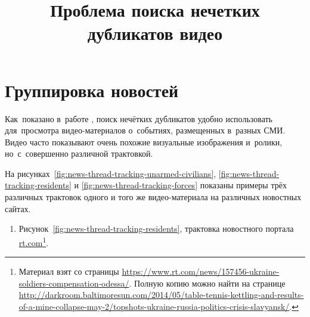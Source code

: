 \documentclass{.local/lib/classes/ndvr-super-article-standalone}
\title[NDVR thesis-abstract]{%
    Проблема поиска нечетких дубликатов видео%
}
\begin{document}
    \section{Группировка новостей}

    Как~показано в~работе \cite{Zhao:2007}, 
    поиск нечётких дубликатов удобно использовать для~просмотра
    видео-материалов о~событиях, размещенных в~разных СМИ.
    Видео часто показывают очень похожие визуальные изображения и~ролики,
    но~с~совершенно различной трактовкой.

    На рисунках~\ref{fig:news-thread-tracking-unarmed-civilians},
    \ref{fig:news-thread-tracking-residents} и
    \ref{fig:news-thread-tracking-forces} 
    показаны примеры трёх различных трактовок одного 
    и того же видео-материала на различных новостных сайтах.
    \begin{enumerate}
        \item Рисунок~\ref{fig:news-thread-tracking-residents},
            трактовка новостного портала
            \href{http://rt.com}%
            {rt.com}\footnote{
                Материал взят со страницы 
                \href{https://www.rt.com/news/157456-ukraine-soldiers-compensation-odessa/}%
                {https://www.rt.com/news/157456-ukraine-soldiers-compensation-odessa/}.
                Полную копию можно найти на странице
                \href{http://darkroom.baltimoresun.com/2014/05/table-tennis-kettling-and-results-of-a-mine-collapse-may-2/topshots-ukraine-russia-politics-crisis-slavyansk/}%
                {http://darkroom.baltimoresun.com/2014/05/table-tennis-kettling-and-results-of-a-mine-collapse-may-2/topshots-ukraine-russia-politics-crisis-slavyansk/}.
            }.
\end{enumerate}
\end{document}
